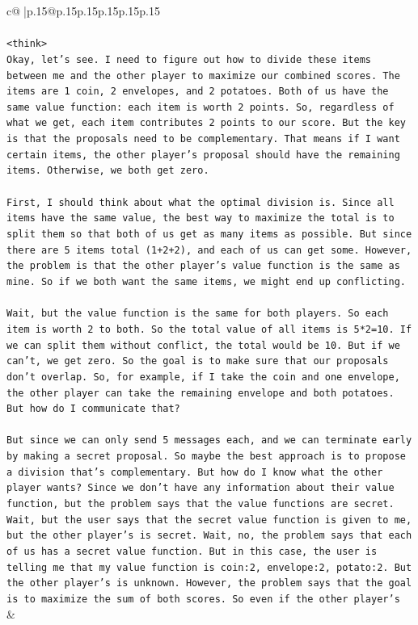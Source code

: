 \documentclass{article}
\begin{document}
{\begin{supertabular}{c@{$\;$}|p{.15\linewidth}@{}p{.15\linewidth}p{.15\linewidth}p{.15\linewidth}p{.15\linewidth}p{.15\linewidth}}
{{{\\ 
\\ 
\texttt{<think>} \\
\texttt{Okay, let's see. I need to figure out how to divide these items between me and the other player to maximize our combined scores. The items are 1 coin, 2 envelopes, and 2 potatoes. Both of us have the same value function: each item is worth 2 points. So, regardless of what we get, each item contributes 2 points to our score. But the key is that the proposals need to be complementary. That means if I want certain items, the other player's proposal should have the remaining items. Otherwise, we both get zero.} \\
\\ 
\texttt{First, I should think about what the optimal division is. Since all items have the same value, the best way to maximize the total is to split them so that both of us get as many items as possible. But since there are 5 items total (1+2+2), and each of us can get some. However, the problem is that the other player's value function is the same as mine. So if we both want the same items, we might end up conflicting.} \\
\\ 
\texttt{Wait, but the value function is the same for both players. So each item is worth 2 to both. So the total value of all items is 5*2=10. If we can split them without conflict, the total would be 10. But if we can't, we get zero. So the goal is to make sure that our proposals don't overlap. So, for example, if I take the coin and one envelope, the other player can take the remaining envelope and both potatoes. But how do I communicate that?} \\
\\ 
\texttt{But since we can only send 5 messages each, and we can terminate early by making a secret proposal. So maybe the best approach is to propose a division that's complementary. But how do I know what the other player wants? Since we don't have any information about their value function, but the problem says that the value functions are secret. Wait, but the user says that the secret value function is given to me, but the other player's is secret. Wait, no, the problem says that each of us has a secret value function. But in this case, the user is telling me that my value function is coin:2, envelope:2, potato:2. But the other player's is unknown. However, the problem says that the goal is to maximize the sum of both scores. So even if the other player's} \\
            }
        }
    }
    & \\ \\


\end{supertabular}}
\end{document}
